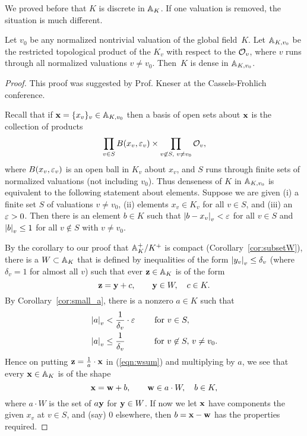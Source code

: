 We proved before that $K$ is discrete in $\AA_K$.  If one valuation is
removed, the situation is much different.
\begin{theorem}\label{thm:strong}
  Let $v_0$ be any normalized nontrivial valuation of the global field~$K$.
  Let $\AA_{K,v_0}$ be the restricted topological product of the
  $K_v$ with respect to the $\O_v$, where $v$ runs through all
  normalized valuations $v\neq v_0$.  Then~$K$ is dense in
  $\AA_{K,v_0}$.
\end{theorem}
\begin{proof}
This proof was suggested by Prof. Kneser at the Cassels-Frohlich
conference.

Recall that if $\bx =\{x_v\}_v\in \AA_{K,v_0}$ then a basis of open
sets about $\bx$ is the collection of products 
$$\prod_{v\in S} B(x_v,\eps_v) \times \prod_{v\not\in S,\,\, v\neq v_0} \O_v,$$
where $B(x_v,\eps_v)$ is an open ball in $K_v$ about $x_v$, and
$S$ runs through finite sets of normalized valuations (not including
$v_0$).  Thus
denseness of $K$ in $\AA_{K,v_0}$ is equivalent to the following
statement about elements.  Suppose we are given (i) a finite set $S$
of valuations $v\neq v_0$, (ii) elements $x_v\in K_v$ for all $v\in
S$, and (iii) an $\eps>0$.  Then there is an element $b\in K$ such that
$\abs{b-x_v}_v<\eps$ for all $v\in S$ and $\abs{b}_v\leq 1$ for all
$v\not\in S$ with $v\neq v_0$.

By the corollary to our proof that $\AA_K^+/K^+$ is compact
(Corollary~\ref{cor:subsetW}), there is a $W\subset \AA_K$ that is
defined by inequalities of the form $\abs{y_v}_v\leq \delta_v$ (where
$\delta_v=1$ for almost all $v$) such that ever $\mathbf{z}\in \AA_K$
is of the form
\begin{equation}\label{eqn:wsum}
  \mathbf{z} = \by + c, \qquad \by\in W, \quad c\in K.
\end{equation}
By Corollary~\ref{cor:small_a}, there is a nonzero $a\in K$ such
that 
\begin{align*}
  \abs{a}_v &< \frac{1}{\delta_v}\cdot \eps\qquad \text{ for }v\in S,\\
  \abs{a}_v &\leq \frac{1}{\delta_v} \qquad\,\quad \text{ for } v\not\in S,\, v\neq v_0.
\end{align*}
Hence on putting $\mathbf{z} = \frac{1}{a}\cdot \bx$ 
in (\ref{eqn:wsum}) and multiplying by $a$, we see that
every $\bx\in \AA_K$ is of the shape
$$
  \bx = \mathbf{w} + b,\qquad \mathbf{w}\in a\cdot W, \quad b\in K,
$$
where $a\cdot W$ is the set of $a\by$ for $\by\in W$.
If now we let $\bx$ have components the given $x_v$ at $v\in S$,
and (say) $0$ elsewhere, then $b=\bx-\bw$ has the properties required. 
\end{proof}

